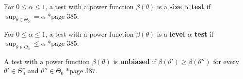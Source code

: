 \begin{defe} \label{defe: size_test}
    For $0 \leq \alpha \leq 1$, a test with a power function $\beta (\theta)$ is a {\bf size $\alpha$ test} if $\sup_{\theta \in \Theta_0} = \alpha$ \cite{CasellaGeorge2001SI}*{page 385}.
\end{defe}

\begin{defe} \label{defe: level_test}
    For $0 \leq \alpha \leq 1$, a test with a power function $\beta (\theta)$ is a {\bf level $\alpha$ test} if $\sup_{\theta \in \Theta_0} \leq \alpha$ \cite{CasellaGeorge2001SI}*{page 385}.
\end{defe}

\begin{defe} \label{defe: unbiased_test}
    A test with a power function $\beta (\theta)$ is {\bf unbiased} if $\beta (\theta ') \geq \beta (\theta'')$ for every $\theta' \in \Theta_0^c$ and $\theta'' \in \Theta_0$ \cite{CasellaGeorge2001SI}*{page 387}.
\end{defe}